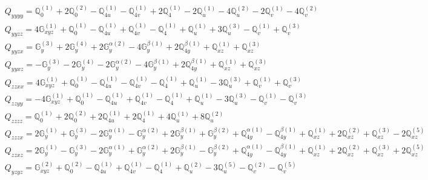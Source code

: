 \documentclass[fleqn,8pt,landscape]{jsarticle}
\begin{document}
\begin{align*}
& Q_{yyyy} = \mathbb{Q}_{0}^{(1)} + 2 \mathbb{Q}_{0}^{(2)} - \mathbb{Q}_{4u}^{(1)} - \mathbb{Q}_{4v}^{(1)} + 2 \mathbb{Q}_{4}^{(1)} - 2 \mathbb{Q}_{u}^{(1)} - 4 \mathbb{Q}_{u}^{(2)} - 2 \mathbb{Q}_{v}^{(1)} - 4 \mathbb{Q}_{v}^{(2)} \\
& Q_{yyzz} = 4 \mathbb{G}_{xyz}^{(1)} + \mathbb{Q}_{0}^{(1)} - \mathbb{Q}_{4u}^{(1)} + \mathbb{Q}_{4v}^{(1)} - \mathbb{Q}_{4}^{(1)} + \mathbb{Q}_{u}^{(1)} + 3 \mathbb{Q}_{u}^{(3)} - \mathbb{Q}_{v}^{(1)} + \mathbb{Q}_{v}^{(3)} \\
& Q_{yyzx} = \mathbb{G}_{y}^{(3)} + 2 \mathbb{G}_{y}^{(4)} + 2 \mathbb{G}_{y}^{\alpha(2)} - 4 \mathbb{G}_{y}^{\beta(1)} + 2 \mathbb{Q}_{4y}^{\beta(1)} + \mathbb{Q}_{xz}^{(1)} + \mathbb{Q}_{xz}^{(3)} \\
& Q_{yyxz} = - \mathbb{G}_{y}^{(3)} - 2 \mathbb{G}_{y}^{(4)} - 2 \mathbb{G}_{y}^{\alpha(2)} - 4 \mathbb{G}_{y}^{\beta(1)} + 2 \mathbb{Q}_{4y}^{\beta(1)} + \mathbb{Q}_{xz}^{(1)} + \mathbb{Q}_{xz}^{(3)} \\
& Q_{zzxx} = 4 \mathbb{G}_{xyz}^{(1)} + \mathbb{Q}_{0}^{(1)} - \mathbb{Q}_{4u}^{(1)} - \mathbb{Q}_{4v}^{(1)} - \mathbb{Q}_{4}^{(1)} + \mathbb{Q}_{u}^{(1)} - 3 \mathbb{Q}_{u}^{(3)} + \mathbb{Q}_{v}^{(1)} + \mathbb{Q}_{v}^{(3)} \\
& Q_{zzyy} = - 4 \mathbb{G}_{xyz}^{(1)} + \mathbb{Q}_{0}^{(1)} - \mathbb{Q}_{4u}^{(1)} + \mathbb{Q}_{4v}^{(1)} - \mathbb{Q}_{4}^{(1)} + \mathbb{Q}_{u}^{(1)} - 3 \mathbb{Q}_{u}^{(3)} - \mathbb{Q}_{v}^{(1)} - \mathbb{Q}_{v}^{(3)} \\
& Q_{zzzz} = \mathbb{Q}_{0}^{(1)} + 2 \mathbb{Q}_{0}^{(2)} + 2 \mathbb{Q}_{4u}^{(1)} + 2 \mathbb{Q}_{4}^{(1)} + 4 \mathbb{Q}_{u}^{(1)} + 8 \mathbb{Q}_{u}^{(2)} \\
& Q_{zzzx} = 2 \mathbb{G}_{y}^{(1)} + \mathbb{G}_{y}^{(3)} - 2 \mathbb{G}_{y}^{\alpha(1)} - \mathbb{G}_{y}^{\alpha(2)} + 2 \mathbb{G}_{y}^{\beta(1)} + \mathbb{G}_{y}^{\beta(2)} + \mathbb{Q}_{4y}^{\alpha(1)} - \mathbb{Q}_{4y}^{\beta(1)} + \mathbb{Q}_{xz}^{(1)} + 2 \mathbb{Q}_{xz}^{(2)} + \mathbb{Q}_{xz}^{(3)} - 2 \mathbb{Q}_{xz}^{(5)} \\
& Q_{zzxz} = 2 \mathbb{G}_{y}^{(1)} - \mathbb{G}_{y}^{(3)} - 2 \mathbb{G}_{y}^{\alpha(1)} + \mathbb{G}_{y}^{\alpha(2)} + 2 \mathbb{G}_{y}^{\beta(1)} - \mathbb{G}_{y}^{\beta(2)} + \mathbb{Q}_{4y}^{\alpha(1)} - \mathbb{Q}_{4y}^{\beta(1)} + \mathbb{Q}_{xz}^{(1)} + 2 \mathbb{Q}_{xz}^{(2)} + \mathbb{Q}_{xz}^{(3)} + 2 \mathbb{Q}_{xz}^{(5)} \\
& Q_{yzyz} = \mathbb{G}_{xyz}^{(2)} + \mathbb{Q}_{0}^{(2)} - \mathbb{Q}_{4u}^{(1)} + \mathbb{Q}_{4v}^{(1)} - \mathbb{Q}_{4}^{(1)} + \mathbb{Q}_{u}^{(2)} - 3 \mathbb{Q}_{u}^{(5)} - \mathbb{Q}_{v}^{(2)} - \mathbb{Q}_{v}^{(5)} \\

\end{align*}
\end{document}
